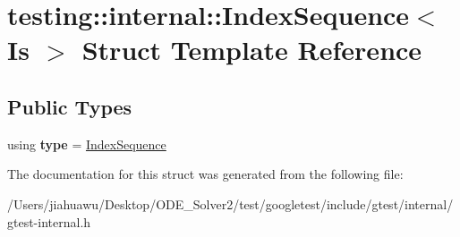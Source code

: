 \hypertarget{structtesting_1_1internal_1_1_index_sequence}{}\section{testing\+:\+:internal\+:\+:Index\+Sequence$<$ Is $>$ Struct Template Reference}
\label{structtesting_1_1internal_1_1_index_sequence}
\subsection*{Public Types}
\begin{DoxyCompactItemize}
\item 
\mbox{\label{structtesting_1_1internal_1_1_index_sequence_a89bb13a7b5d169b69659f395dcec2b2d}} 
using {\bfseries type} = \mbox{\hyperlink{structtesting_1_1internal_1_1_index_sequence}{Index\+Sequence}}
\end{DoxyCompactItemize}


The documentation for this struct was generated from the following file\+:\begin{DoxyCompactItemize}
\item 
/\+Users/jiahuawu/\+Desktop/\+O\+D\+E\+\_\+\+Solver2/test/googletest/include/gtest/internal/gtest-\/internal.\+h\end{DoxyCompactItemize}
